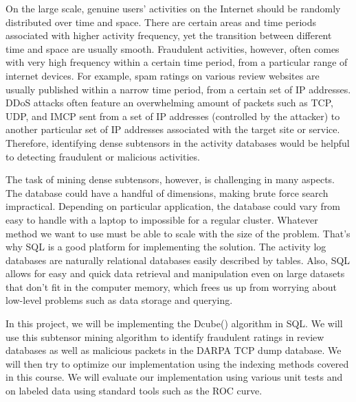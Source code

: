 
On the large scale, genuine users' activities on the Internet should be randomly distributed over time and space. There are certain areas and time periods associated with higher activity frequency, yet the transition between different time and space are usually smooth. Fraudulent activities, however, often comes with very high frequency within a certain time period, from a particular range of internet devices. For example, spam ratings on various review websites are usually published within a narrow time period, from a certain set of IP addresses. DDoS attacks often feature an overwhelming amount of packets such as TCP, UDP, and IMCP sent from a set of IP addresses (controlled by the attacker) to another particular set of IP addresses associated with the target site or service. Therefore, identifying dense subtensors in the activity databases would be helpful to detecting fraudulent or malicious activities.

The task of mining dense subtensors, however, is challenging in many aspects. The database could have a handful of dimensions, making brute force search impractical. Depending on particular application, the database could vary from easy to handle with a laptop to impossible for a regular cluster. Whatever method we want to use must be able to scale with the size of the problem. That's why SQL is a good platform for implementing the solution. The activity log databases are naturally relational databases easily described by tables. Also, SQL allows for easy and quick data retrieval and manipulation even on large datasets that don't fit in the computer memory, which frees us up from worrying about low-level problems such as data storage and querying.

In this project, we will be implementing the Dcube(\cite{shin2017d}) algorithm in SQL. We will use this subtensor mining algorithm to identify fraudulent ratings in review databases as well as malicious packets in the DARPA TCP dump database. We will then try to optimize our implementation using the indexing methods covered in this course. We will evaluate our implementation using various unit tests and on labeled data using standard tools such as the ROC curve. 